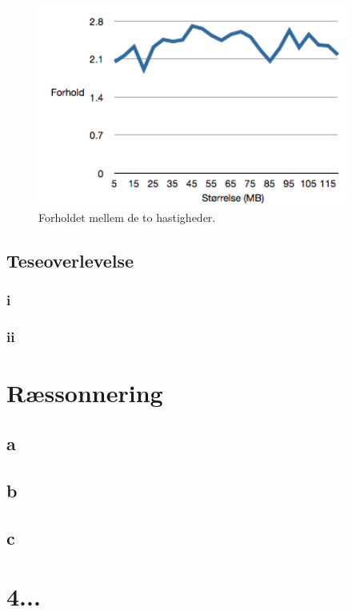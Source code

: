 \documentclass{article}
\begin{document}
\begin{figure}
	\includegraphics[width=4in]{plotforhold.png}
	\caption{Forholdet mellem de to hastigheder.}
	\label{plotforhold}
\end{figure}

\subsection{Teseoverlevelse}

\subsubsection{i}

\subsubsection{ii}

\section{Ræssonnering}

\subsection{a}
\subsection{b}
\subsection{c}

\section{4...}
\end{document}

